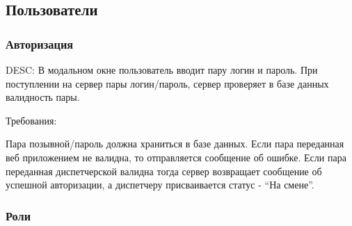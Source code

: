 \subsection{Пользователи}

		\subsubsection{Авторизация}

			DESC:  В модальном окне пользователь вводит пару логин и пароль. При поступлении на сервер пары логин/пароль, сервер проверяет в базе данных валидность пары.

			Требования:

				Пара позывной/пароль должна храниться в базе данных.
				Если пара переданная веб приложением не валидна, то отправляется сообщение об ошибке.
				Если пара переданная диспетчерской валидна тогда сервер возвращает сообщение об успешной авторизации, а диспетчеру присваивается статус - “На смене”.

		\subsubsection{Роли}

